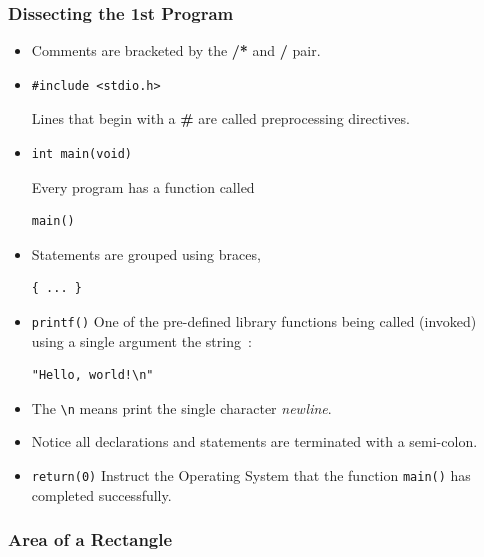 \begin{frame}[fragile]
\frametitle{Dissecting the 1st Program}

\begin{itemize}[<+->]
\item Comments are bracketed by the {\bf /*} and {\bf */} pair.
\item
\begin{verbatim}
#include <stdio.h>
\end{verbatim}
Lines that begin with a {\bf \#}
are called preprocessing directives.
\item \begin{verbatim}
int main(void)
\end{verbatim}
Every program has a function called \begin{verbatim}
main()
\end{verbatim}

\item Statements are grouped using braces,
\begin{verbatim}
{ ... }
\end{verbatim}

\item \verb+printf()+ One of the pre-defined library functions being called (invoked) using a single argument the string~:
\begin{verbatim}
"Hello, world!\n"
\end{verbatim}
\item The \verb+\n+ means print the single character {\it newline}.
\item Notice all declarations and statements are terminated with a
semi-colon.
\item \verb+return(0)+
Instruct the Operating System that the function
\verb+main()+ has completed successfully.
\end{itemize}
\end{frame}



\begin{frame}[fragile]
\frametitle{Area of a Rectangle}
\begin{columns}

\begin{column}{0.9\textwidth}

\end{column}

\end{columns}
\end{frame}

